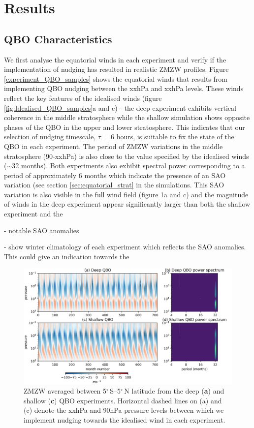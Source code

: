 \section{Results}
\subsection{QBO Characteristics}
We first analyse the equatorial winds in each experiment and verify if the implementation of nudging has resulted in realistic ZMZW profiles. Figure \ref{experiment_QBO_samples} shows the equatorial winds that results from implementing QBO nudging between the xxhPa and xxhPa levels. These winds reflect the key features of the idealised winds (figure \ref{fig:Idealised_QBO_samples}a and c) - the deep experiment exhibits vertical coherence in the middle stratosphere while the shallow simulation shows opposite phases of the QBO in the upper and lower stratosphere. This indicates that our selection of nudging timescale, $\tau$ = 6 hours, is suitable to fix the state of the QBO in each experiment. The period of ZMZW variations in the middle stratosphere (90-xxhPa) is also close to the value specified by the idealised winds ($\sim$32 months). Both experiments also exhibit spectral power corresponding to a period of approximately 6 months which indicate the presence of an SAO variation (see section \ref{sec:equatorial_strat} in the simulations. This SAO variation is also visible in the full wind field (figure \ref{fig:experiment_QBOs}a and c) and the magnitude of winds in the deep experiment appear significantly larger than both the shallow experiment and the  

- notable SAO anomalies

- show winter climatology of each experiment which reflects the SAO anomalies. This could give an indication towards the 

\begin{figure}[h!]
\begin{center}
\noindent\includegraphics[width = \linewidth]{Figures/Figures-deepQBO/experiment_QBOs.png}
\caption[Equatorial ZMZW time-height profiles from QBO nudging experiments]{ZMZW averaged between 5$^{\circ}$\,S--5$^{\circ}$\,N latitude from the deep (\textbf{a}) and shallow (\textbf{c}) QBO experiments. Horizontal dashed lines on (a) and (c) denote the xxhPa and 90hPa pressure levels between which we implement nudging towards the idealised wind in each experiment.}
\label{fig:experiment_QBOs}
\end{center}
\end{figure}

